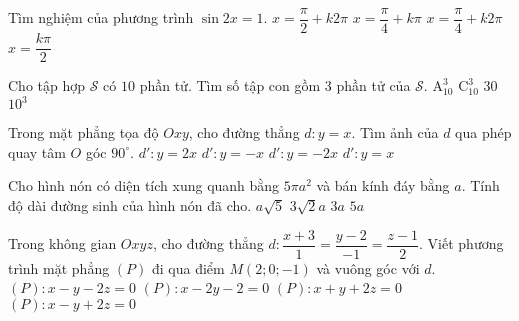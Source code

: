 \begin{ex}%
	Tìm nghiệm của phương trình $\sin{2x}=1$.
	\choice
	{$x =\dfrac{\pi}{2}+k2\pi$}
		{\True $x =\dfrac{\pi}{4}+k\pi$}
			{$x =\dfrac{\pi}{4}+k2\pi$}
				{$x =\dfrac{k\pi}{2}$}
	\end{ex}
\begin{ex}%
	Cho tập hợp $\mathcal{S}$ có $10$ phần tử. Tìm số tập con gồm $3$ phần tử của $\mathcal{S}$.
	\choice
	{$\mathrm{A}_{10}^3$}
	{\True $\mathrm{C}_{10}^3$}
	{$30$}
	{$10^3$}
	\end{ex}
\begin{ex}%
	Trong mặt phẳng tọa độ $Oxy$, cho đường thẳng $d:y=x$. Tìm ảnh của $d$ qua phép quay tâm $O$ góc $90^\circ$.
	\choice
	{$d':y=2x$}
	{\True $d': y=-x$}
	{$d': y=-2x$}
	{$d': y=x$}
	\end{ex}
\begin{ex}%
	Cho hình nón có diện tích xung quanh bằng $5 \pi a^2$ và bán kính đáy bằng $a$. Tính độ dài đường sinh của hình nón đã cho.
	\choice
	{$a \sqrt{5}$}
	{$3\sqrt{2}a$}
	{$3a$}
	{\True $5a$}
	\end{ex}
\begin{ex}%
	Trong không gian $Oxyz$, cho đường thẳng $d:\dfrac{x+3}{1}=\dfrac{y-2}{-1}=\dfrac{z-1}{2}$. Viết phương trình mặt phẳng $(P)$ đi qua điểm $M(2;0;-1)$ và vuông góc với $d$.
	\choice
	{$(P):x-y-2z=0$}
	{$(P):x-2y-2=0$}
	{$(P):x+y+2z=0$}
	{\True $(P):x-y+2z=0$}
	\end{ex}
